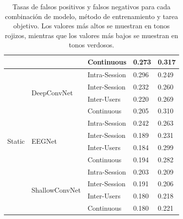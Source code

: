 \begin{table}[!ht]
\begin{tabular}{|p{3em}|p{7em}|p{3cm}|p{3cm}|p{3cm}|}
                               &                                   & Continuous               & \cellcolor[HTML]{FBE4D5}0.273 & \cellcolor[HTML]{FADDCA}0.317 \\ \hline
    \multirow{12}{4em}{Static} & \multirow{4}{4em}{DeepConvNet}    & Intra-Session            & \cellcolor[HTML]{F9CFB4}0.296 & \cellcolor[HTML]{E3F7E7}0.249 \\ \cline{3-5}
                               &                                   & Inter-Session            & \cellcolor[HTML]{F3FCF5}0.232 & \cellcolor[HTML]{EDFAF0}0.260 \\ \cline{3-5}
                               &                                   & Inter-Users              & \cellcolor[HTML]{E7F8EB}0.220 & \cellcolor[HTML]{F5FCF6}0.269 \\ \cline{3-5}
                               &                                   & Continuous               & \cellcolor[HTML]{D9F4DE}0.205 & \cellcolor[HTML]{FBE4D4}0.310 \\ \cline{2-5}
                               & \multirow{4}{4em}{EEGNet}         & Intra-Session            & \cellcolor[HTML]{FEFFFE}0.242 & \cellcolor[HTML]{F0FBF2}0.263 \\ \cline{3-5}
                               &                                   & Inter-Session            & \cellcolor[HTML]{CAF0D1}0.189 & \cellcolor[HTML]{D2F2D8}0.231 \\ \cline{3-5}
                               &                                   & Inter-Users              & \cellcolor[HTML]{C6EFCE}0.184 & \cellcolor[HTML]{FDEDE3}0.299 \\ \cline{3-5}
                               &                                   & Continuous               & \cellcolor[HTML]{CEF1D5}0.194 & \cellcolor[HTML]{FFFDFB}0.282 \\ \cline{2-5}
                               & \multirow{4}{4em}{ShallowConvNet} & Intra-Session            & \cellcolor[HTML]{D7F4DD}0.203 & \cellcolor[HTML]{C6EFCE}0.209 \\ \cline{3-5}
                               &                                   & Inter-Session            & \cellcolor[HTML]{CCF1D3}0.191 & \cellcolor[HTML]{C6EFCE}0.206 \\ \cline{3-5}
                               &                                   & Inter-Users              & \cellcolor[HTML]{C6EFCE}0.180 & \cellcolor[HTML]{C6EFCE}0.218 \\ \cline{3-5}
                               &                                   & Continuous               & \cellcolor[HTML]{C6EFCE}0.180 & \cellcolor[HTML]{C8F0D0}0.221 \\ \hline
  \end{tabular}
  \caption{Tasas de falsos positivos y falsos negativos para cada combinación de modelo, método de entrenamiento y tarea objetivo. Los valores más altos se muestran en tonos rojizos, mientras que los valores más bajos se muestran en tonos verdosos.}
  \label{tab:false_positive_negative_rates}
\end{table}

